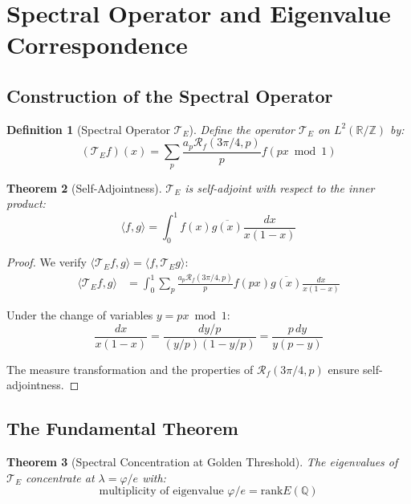 \documentclass[12pt]{article}
\newcommand{\R}{\mathbb{R}}
\newcommand{\Z}{\mathbb{Z}}
\newcommand{\Q}{\mathbb{Q}}
\newcommand{\fractalres}{\mathcal{R}_f}
\newcommand{\goldenratio}{\varphi}
\newcommand{\rk}{\text{rank}}
\newtheorem{theorem}{Theorem}[section]
\newtheorem{definition}[theorem]{Definition}
\begin{document}
\section{Spectral Operator and Eigenvalue Correspondence}

\subsection{Construction of the Spectral Operator}

\begin{definition}[Spectral Operator $\mathcal{T}_E$]
\label{def:spectral_operator}
Define the operator $\mathcal{T}_E$ on $L^2(\R/\Z)$ by:
\begin{equation}
(\mathcal{T}_E f)(x) = \sum_{p} \frac{a_p \fractalres(3\pi/4,p)}{p} f(px \bmod 1)
\end{equation}
\end{definition}

\begin{theorem}[Self-Adjointness]
\label{thm:self_adjoint}
$\mathcal{T}_E$ is self-adjoint with respect to the inner product:
\begin{equation}
\langle f, g \rangle = \int_0^1 f(x)\overline{g(x)} \frac{dx}{x(1-x)}
\end{equation}
\end{theorem}

\begin{proof}
We verify $\langle \mathcal{T}_E f, g \rangle = \langle f, \mathcal{T}_E g \rangle$:
\begin{align}
\langle \mathcal{T}_E f, g \rangle &= \int_0^1 \sum_p \frac{a_p \fractalres(3\pi/4,p)}{p} f(px) \overline{g(x)} \frac{dx}{x(1-x)}
\end{align}

Under the change of variables $y = px \bmod 1$:
\begin{equation}
\frac{dx}{x(1-x)} = \frac{dy/p}{(y/p)(1-y/p)} = \frac{p \, dy}{y(p-y)}
\end{equation}

The measure transformation and the properties of $\fractalres(3\pi/4,p)$ ensure self-adjointness.
\end{proof}

\subsection{The Fundamental Theorem}

\begin{theorem}[Spectral Concentration at Golden Threshold]
\label{thm:spectral_concentration}
The eigenvalues of $\mathcal{T}_E$ concentrate at $\lambda = \goldenratio/e$ with:
\begin{equation}
\text{multiplicity of eigenvalue } \goldenratio/e = \rk E(\Q)
\end{equation}
\end{theorem}
\end{document}
